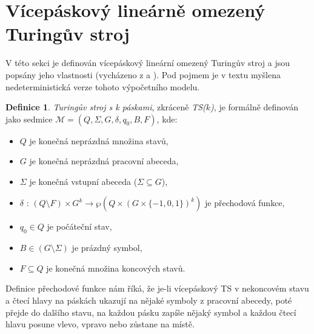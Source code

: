 \documentclass[thesis=B,czech]{FITthesis}[2019/12/23]
\theoremstyle{definition}
\newtheorem{definition}{Definice}[chapter]
\begin{document}
\section{Vícepáskový lineárně omezený Turingův stroj}\label{sec:turmac}

V této sekci je definován vícepáskový lineární omezený Turingův stroj a jsou popsány jeho vlastnosti (vycházeno z \cite{sestakova} a \cite{hopcroft}).
Pod pojmem  je v textu myšlena nedeterministická verze tohoto výpočetního modelu.  

\begin{definition}
\emph{Turingův stroj s k páskami}, zkráceně \emph{TS($k$)}, je formálně definován jako sedmice $\mathcal{M} = \left(Q, \Sigma, G, \delta, q_0, B, F\right)$, kde:
\begin{itemize}
	\item{$Q$ je konečná neprázdná množina stavů,}
	\item{$G$ je konečná neprázdná pracovní abeceda,}
	\item{$\Sigma$ je konečná vstupní abeceda ($\Sigma \subseteq G$),}
	\item{$\delta$ : $\left(Q \setminus F\right) \times  G^k \rightarrow \wp\left( Q\times \left(G \times \{-1, 0, 1\}\right)^k \right)$ je přechodová funkce,}
	\item{$q_0 \in Q$ je počáteční stav,}
	\item{$B \in \left(G\setminus\Sigma\right)$ je prázdný symbol,}
	\item{$F \subseteq Q$ je konečná množina koncových stavů.}
\end{itemize}
\end{definition}
Definice přechodové funkce nám říká, že je-li vícepáskový TS v nekoncovém stavu a čtecí hlavy na páskách ukazují na nějaké symboly z pracovní abecedy, poté přejde do dalšího stavu, na každou pásku zapíše nějaký symbol a každou čtecí hlavu posune vlevo, vpravo nebo zůstane na místě.
\end{document}
